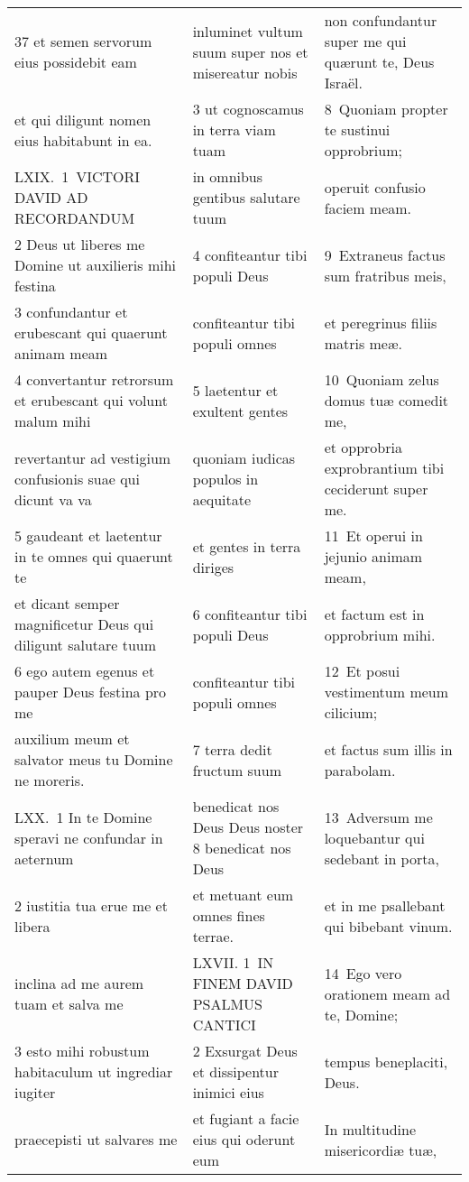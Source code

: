\documentclass{article}
\begin{document}
\begin{longtable}{@{}p{}p{}p{}@{}}
37 et semen servorum eius possidebit eam	&	inluminet vultum suum super nos et misereatur nobis	&	non confundantur super me qui quærunt te, Deus Israël.	\\
et qui diligunt nomen eius habitabunt in ea.	&	3 ut cognoscamus in terra viam tuam	&	8 Quoniam propter te sustinui opprobrium;	\\
LXIX. 1 VICTORI DAVID AD RECORDANDUM	&	in omnibus gentibus salutare tuum	&	operuit confusio faciem meam.	\\
2 Deus ut liberes me Domine ut auxilieris mihi festina	&	4 confiteantur tibi populi Deus	&	9 Extraneus factus sum fratribus meis,	\\
3 confundantur et erubescant qui quaerunt animam meam	&	confiteantur tibi populi omnes	&	et peregrinus filiis matris meæ.	\\
4 convertantur retrorsum et erubescant qui volunt malum mihi	&	5 laetentur et exultent gentes	&	10 Quoniam zelus domus tuæ comedit me,	\\
revertantur ad vestigium confusionis suae qui dicunt va va	&	quoniam iudicas populos in aequitate	&	et opprobria exprobrantium tibi ceciderunt super me.	\\
5 gaudeant et laetentur in te omnes qui quaerunt te	&	et gentes in terra diriges	&	11 Et operui in jejunio animam meam,	\\
et dicant semper magnificetur Deus qui diligunt salutare tuum	&	6 confiteantur tibi populi Deus	&	et factum est in opprobrium mihi.	\\
6 ego autem egenus et pauper Deus festina pro me	&	confiteantur tibi populi omnes	&	12 Et posui vestimentum meum cilicium;	\\
auxilium meum et salvator meus tu Domine ne moreris.	&	7 terra dedit fructum suum	&	et factus sum illis in parabolam.	\\
LXX. 1 In te Domine speravi ne confundar in aeternum	&	benedicat nos Deus Deus noster 8 benedicat nos Deus	&	13 Adversum me loquebantur qui sedebant in porta,	\\
2 iustitia tua erue me et libera	&	et metuant eum omnes fines terrae.	&	et in me psallebant qui bibebant vinum.	\\
inclina ad me aurem tuam et salva me	&	LXVII. 1 IN FINEM DAVID PSALMUS CANTICI	&	14 Ego vero orationem meam ad te, Domine;	\\
3 esto mihi robustum habitaculum ut ingrediar iugiter	&	2 Exsurgat Deus et dissipentur inimici eius	&	tempus beneplaciti, Deus.	\\
praecepisti ut salvares me	&	et fugiant a facie eius qui oderunt eum	&	In multitudine misericordiæ tuæ,	\\

\end{longtable}
\end{document}
